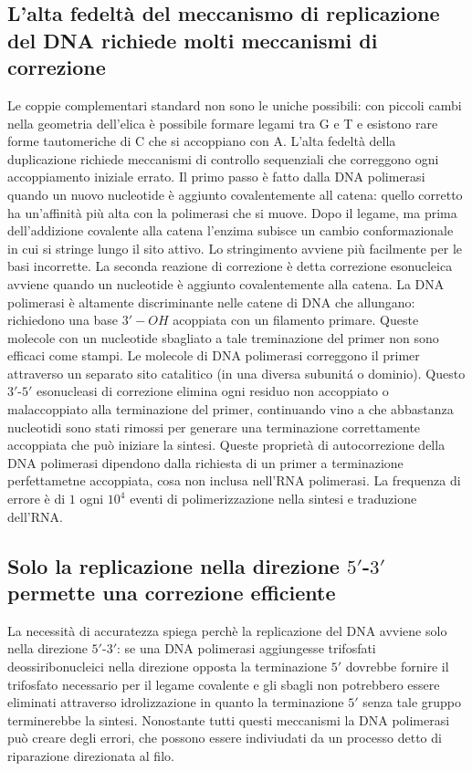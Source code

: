 \subsection{L'alta fedelt\`a del meccanismo di replicazione del DNA richiede molti meccanismi di correzione}
Le coppie complementari standard non sono le uniche possibili: con piccoli cambi nella geometria dell'elica \`e possibile formare legami tra G e T e esistono rare forme tautomeriche di C
che si accoppiano con A. L'alta fedelt\`a della duplicazione richiede meccanismi di controllo sequenziali che correggono ogni accoppiamento iniziale errato. Il primo passo \`e fatto 
dalla DNA polimerasi quando un nuovo nucleotide \`e aggiunto covalentemente all catena: quello corretto ha un'affinit\`a pi\`u alta con la polimerasi che si muove. Dopo il legame, ma
prima dell'addizione covalente alla catena l'enzima subisce un cambio conformazionale in cui si stringe lungo il sito attivo. Lo stringimento avviene pi\`u facilmente per le basi 
incorrette. La seconda reazione di correzione \`e detta correzione esonucleica avviene quando un nucleotide \`e aggiunto covalentemente alla catena. La DNA polimerasi \`e altamente 
discriminante nelle catene di DNA che allungano: richiedono una base $3'-OH$ acoppiata con un filamento primare. Queste molecole con un nucleotide sbagliato a tale treminazione del
primer non sono efficaci come stampi. Le molecole di DNA polimerasi correggono il primer attraverso un separato sito catalitico (in una diversa subunit\'a o dominio). Questo
$3'$-$5'$ esonucleasi di correzione elimina ogni residuo non accoppiato o malaccoppiato alla terminazione del primer, continuando vino a che abbastanza nucleotidi sono stati rimossi per
generare una terminazione correttamente accoppiata che pu\`o iniziare la sintesi. Queste propriet\`a di autocorrezione della DNA polimerasi dipendono dalla richiesta di un primer a 
terminazione perfettametne accoppiata, cosa non inclusa nell'RNA polimerasi. La frequenza di errore \`e di $1$ ogni $10^4$ eventi di polimerizzazione nella sintesi e traduzione dell'RNA.
\subsection{Solo la replicazione nella direzione $5'$-$3'$ permette una correzione efficiente}
La necessit\`a di accuratezza spiega perch\`e la replicazione del DNA avviene solo nella direzione $5'$-$3'$: se una DNA polimerasi aggiungesse trifosfati deossiribonucleici nella 
direzione opposta la terminazione $5'$ dovrebbe fornire il trifosfato necessario per il legame covalente e gli sbagli non potrebbero essere eliminati attraverso idrolizzazione in quanto
la terminazione $5'$ senza tale gruppo terminerebbe la sintesi. Nonostante tutti questi meccanismi la DNA polimerasi pu\`o creare degli errori, che possono essere indiviudati da un 
processo detto di riparazione direzionata al filo. 

